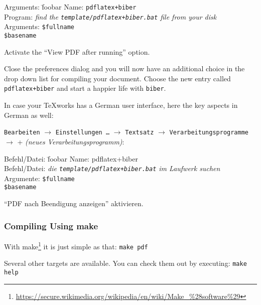 \begin{tabbing}
  Arguments: \= foobar  \kill
  Name:      \> \verb#pdflatex+biber# \\
  Program:   \> \emph{find the \texttt{template/pdflatex+biber.bat} file from your disk} \\
  Arguments: \> \verb+$fullname+ \\
             \> \verb+$basename+
\end{tabbing}

Activate the \enquote{View PDF after running} option.

Close the preferences dialog and you will now have an additional
choice in the drop down list for compiling your document. Choose the
new entry called \verb#pdflatex+biber# and start a happier life with
\texttt{biber}.

In case your TeXworks has a German user interface, here the key
aspects in German as well:

\begin{otherlanguage}{ngerman}

  \texttt{Bearbeiten} $\rightarrow$ \texttt{Einstellungen~\ldots} $\rightarrow$
  \texttt{Textsatz} $\rightarrow$ \texttt{Verarbeitungsprogramme} $\rightarrow$
  + \emph{(neues Verarbeitungsprogramm)}:

\begin{tabbing}
  Befehl/Datei: \= foobar  \kill
    Name: \> pdflatex+biber \\
    Befehl/Datei: \> \emph{die \texttt{template/pdflatex+biber.bat} im Laufwerk suchen} \\
    Argumente: \> \verb+$fullname+ \\
               \> \verb+$basename+
\end{tabbing}

\enquote{PDF nach Beendigung anzeigen} aktivieren.

\end{otherlanguage}


\subsubsection{Compiling Using  make}

With 
make\footnote{\url{https://secure.wikimedia.org/wikipedia/en/wiki/Make\_\%28software\%29}}
it is just simple as that: \texttt{make pdf}

Several other targets are available. You can check them out by
executing: \texttt{make help}


